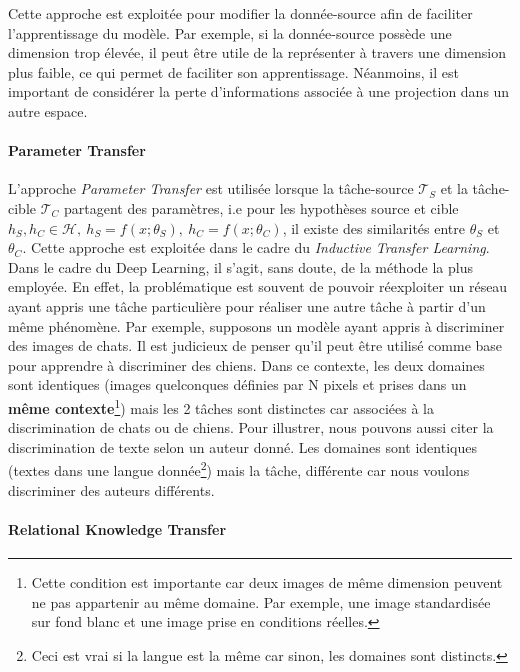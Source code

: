 \noindent Cette approche est exploitée pour modifier la donnée-source afin de faciliter l'apprentissage du modèle. Par exemple, si la donnée-source possède une dimension trop élevée, il peut être utile de la représenter à travers une dimension plus faible, ce qui permet de faciliter son apprentissage. Néanmoins, il est important de considérer la perte d'informations associée à une projection dans un autre espace.

\paragraph{Parameter Transfer}

\noindent L'approche \textit{Parameter Transfer} est utilisée lorsque la tâche-source  $\mathcal{T}_S$ et la tâche-cible $\mathcal{T}_C$ partagent des paramètres, i.e pour les hypothèses source et cible $h_S, h_C \in \mathcal{H}, \ h_S=f(x;\theta_S), \  h_C=f(x;\theta_C)$, il existe des similarités entre $\theta_S$ et $\theta_C$. Cette approche est exploitée dans le cadre du \textit{Inductive Transfer Learning}.\\

\noindent Dans le cadre du Deep Learning, il s'agit, sans doute, de la méthode la plus employée. En effet, la problématique est souvent de pouvoir réexploiter un réseau ayant appris une tâche particulière pour réaliser une autre tâche à partir d'un même phénomène. Par exemple, supposons un modèle ayant appris à discriminer des images de chats. Il est judicieux de penser qu'il peut être utilisé comme base pour apprendre à discriminer des chiens. Dans ce contexte, les deux domaines sont identiques (images quelconques définies par N pixels et prises dans un \textbf{même contexte}\footnote{Cette condition est importante car deux images de même dimension peuvent ne pas appartenir au même domaine. Par exemple, une image standardisée sur fond blanc et une image prise en conditions réelles.}) mais les 2 tâches sont distinctes car associées à la discrimination de chats ou de chiens. Pour illustrer, nous pouvons aussi citer la discrimination de texte selon un auteur donné. Les domaines sont identiques (textes dans une langue donnée\footnote{Ceci est vrai si la langue est la même car sinon, les domaines sont distincts.}) mais la tâche, différente car nous voulons discriminer des auteurs différents.

\paragraph{Relational Knowledge Transfer}

